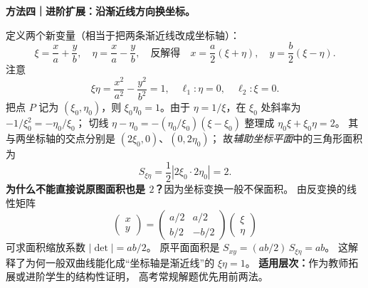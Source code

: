 \begin{proofbox}
\medskip
\textbf{方法四｜进阶扩展：沿渐近线方向换坐标。}
\begin{center}

\end{center}

定义两个新变量（相当于把两条渐近线改成坐标轴）：
\[
\xi=\frac xa+\frac yb,\quad
\eta=\frac xa-\frac yb,
\quad\text{反解得}\quad
x=\frac a2(\xi+\eta),\quad y=\frac b2(\xi-\eta).
\]
注意
\[
\xi\eta=\frac{x^2}{a^2}-\frac{y^2}{b^2}=1,
\quad \ell_1:\eta=0,\quad \ell_2:\xi=0.
\]
把点 $P$ 记为 $(\xi_0,\eta_0)$，则
$\xi_0\eta_0=1$。由于 $\eta=1/\xi$，在 $\xi_0$ 处斜率为
$-1/\xi_0^2=-\eta_0/\xi_0$；
切线 $\eta-\eta_0=-(\eta_0/\xi_0)(\xi-\xi_0)$
整理成 $\eta_0\xi+\xi_0\eta=2$。
其与两坐标轴的交点分别是 $(2\xi_0,0)$、$(0,2\eta_0)$；
故\emph{辅助坐标平面}中的三角形面积为
\[
S_{\xi\eta}=\frac12|2\xi_0\cdot2\eta_0|=2.
\]
\textbf{为什么不能直接说原图面积也是 $2$？}因为坐标变换一般不保面积。
由反变换的线性矩阵
\[
\begin{pmatrix}x\\y\end{pmatrix}
=\begin{pmatrix}a/2&a/2\\ b/2&-b/2\end{pmatrix}
\begin{pmatrix}\xi\\\eta\end{pmatrix}
\]
可求面积缩放系数 $|\det|=ab/2$。
原平面面积是 $S_{xy}=(ab/2)\,S_{\xi\eta}=\boxed{ab}$。
这解释了为何一般双曲线能化成``坐标轴是渐近线''的 $\xi\eta=1$。
\textbf{适用层次：}作为教师拓展或进阶学生的结构性证明，
高考常规解题优先用前两法。
\end{proofbox}

